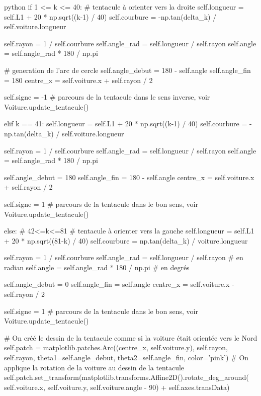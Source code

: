 \begin{mintedbox}{python}
        if 1 <= k <= 40:  # tentacule à orienter vers la droite
            self.longueur = self.L1 + 20 * np.sqrt((k-1) / 40)
            self.courbure = -np.tan(delta_k) / self.voiture.longueur

            self.rayon = 1 / self.courbure
            self.angle_rad = self.longueur / self.rayon
            self.angle = self.angle_rad * 180 / np.pi

            # generation de l'arc de cercle
            self.angle_debut = 180 - self.angle
            self.angle_fin = 180
            centre_x = self.voiture.x + self.rayon / 2

            self.signe = -1  # parcours de la tentacule dans le sens inverse, voir Voiture.update_tentacule()

        elif k == 41:
            self.longueur = self.L1 + 20 * np.sqrt((k-1) / 40)
            self.courbure = -np.tan(delta_k) / self.voiture.longueur

            self.rayon = 1 / self.courbure
            self.angle_rad = self.longueur / self.rayon
            self.angle = self.angle_rad * 180 / np.pi

            self.angle_debut = 180
            self.angle_fin = 180 - self.angle
            centre_x = self.voiture.x + self.rayon / 2

            self.signe = 1  # parcours de la tentacule dans le bon sens, voir Voiture.update_tentacule()

        else:  # 42<=k<=81   # tentacule à orienter vers la gauche
            self.longueur = self.L1 + 20 * np.sqrt((81-k) / 40)
            self.courbure = np.tan(delta_k) / voiture.longueur

            self.rayon = 1 / self.courbure
            self.angle_rad = self.longueur / self.rayon  # en radian
            self.angle = self.angle_rad * 180 / np.pi  # en degrés

            self.angle_debut = 0
            self.angle_fin = self.angle
            centre_x = self.voiture.x - self.rayon / 2

            self.signe = 1  # parcours de la tentacule dans le bon sens, voir Voiture.update_tentacule()

        # On créé le dessin de la tentacule comme si la voiture était orientée vers le Nord
        self.patch = matplotlib.patches.Arc((centre_x, self.voiture.y), self.rayon, self.rayon, theta1=self.angle_debut, theta2=self.angle_fin, color='pink')
        # On applique la rotation de la voiture au dessin de la tentacule
        self.patch.set_transform(matplotlib.transforms.Affine2D().rotate_deg_around( self.voiture.x, self.voiture.y, self.voiture.angle - 90) + self.axes.transData)


\end{mintedbox}

